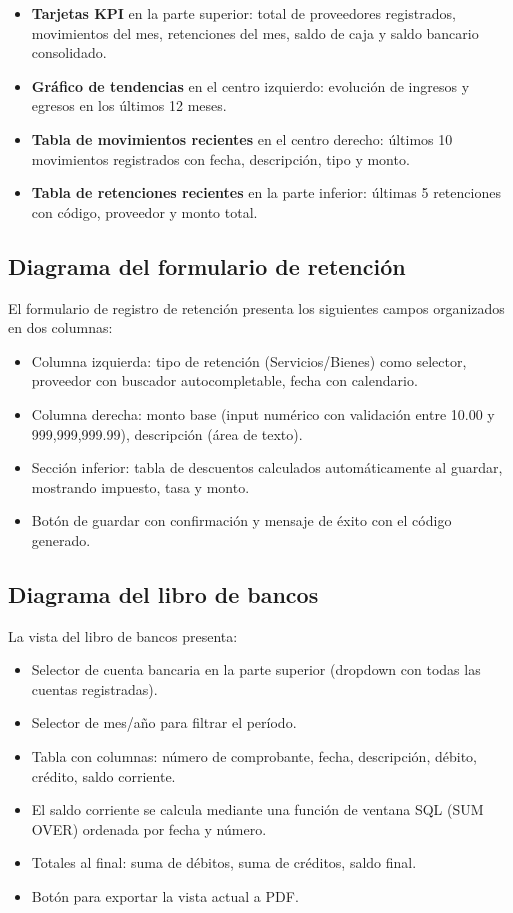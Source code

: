 \documentclass[stu]{apa7}
\begin{document}
\begin{itemize}
    \item \textbf{Tarjetas KPI} en la parte superior: total de proveedores registrados, movimientos del mes, retenciones del mes, saldo de caja y saldo bancario consolidado.
    \item \textbf{Gráfico de tendencias} en el centro izquierdo: evolución de ingresos y egresos en los últimos 12 meses.
    \item \textbf{Tabla de movimientos recientes} en el centro derecho: últimos 10 movimientos registrados con fecha, descripción, tipo y monto.
    \item \textbf{Tabla de retenciones recientes} en la parte inferior: últimas 5 retenciones con código, proveedor y monto total.
\end{itemize}

\subsection{Diagrama del formulario de retención}

El formulario de registro de retención presenta los siguientes campos organizados en dos columnas:

\begin{itemize}
    \item Columna izquierda: tipo de retención (Servicios/Bienes) como selector, proveedor con buscador autocompletable, fecha con calendario.
    \item Columna derecha: monto base (input numérico con validación entre 10.00 y 999,999,999.99), descripción (área de texto).
    \item Sección inferior: tabla de descuentos calculados automáticamente al guardar, mostrando impuesto, tasa y monto.
    \item Botón de guardar con confirmación y mensaje de éxito con el código generado.
\end{itemize}

\subsection{Diagrama del libro de bancos}

La vista del libro de bancos presenta:

\begin{itemize}
    \item Selector de cuenta bancaria en la parte superior (dropdown con todas las cuentas registradas).
    \item Selector de mes/año para filtrar el período.
    \item Tabla con columnas: número de comprobante, fecha, descripción, débito, crédito, saldo corriente.
    \item El saldo corriente se calcula mediante una función de ventana SQL (SUM OVER) ordenada por fecha y número.
    \item Totales al final: suma de débitos, suma de créditos, saldo final.
    \item Botón para exportar la vista actual a PDF.
\end{itemize}
\end{document}

